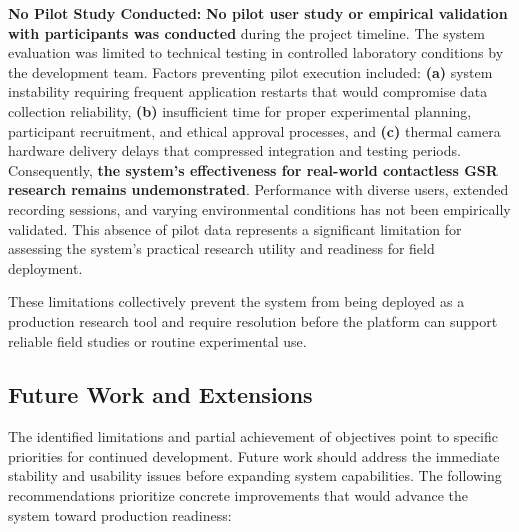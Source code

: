 \documentclass[12pt,a4paper]{article}
\begin{document}
\begin{itemize}
  \textbf{No Pilot Study Conducted:} \textbf{No pilot user study or empirical validation with participants was conducted} during the project timeline. The system evaluation was limited to technical testing in controlled laboratory conditions by the development team. Factors preventing pilot execution included: \textbf{(a)} system instability requiring frequent application restarts that would compromise data collection reliability, \textbf{(b)} insufficient time for proper experimental planning, participant recruitment, and ethical approval processes, and \textbf{(c)} thermal camera hardware delivery delays that compressed integration and testing periods. Consequently, \textbf{the system's effectiveness for real-world contactless GSR research remains undemonstrated}. Performance with diverse users, extended recording sessions, and varying environmental conditions has not been empirically validated. This absence of pilot data represents a significant limitation for assessing the system's practical research utility and readiness for field deployment.
\end{itemize}

These limitations collectively prevent the system from being deployed as a production research tool and require resolution before the platform can support reliable field studies or routine experimental use.

\subsection{Future Work and Extensions}\label{future-work-and-extensions}

The identified limitations and partial achievement of objectives point to specific priorities for continued development. Future work should address the immediate stability and usability issues before expanding system capabilities. The following recommendations prioritize concrete improvements that would advance the system toward production readiness:
\end{document}
